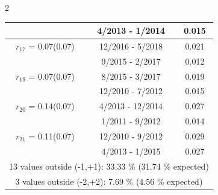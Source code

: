 \begin{multicols}{2}
{\begin{tabular}{ccc}
&        4/2013 -  1/2014 &        0.015  \vspace{-.02in} \\ \hline 
  $r_{17}$ = 0.07(0.07) &      12/2016 -  5/2018 &        0.021   \vspace{-.10in} \\  
&        9/2015 -  2/2017 &        0.012  \vspace{-.02in} \\ \hline 
  $r_{19}$ = 0.07(0.07) &       8/2015 -  3/2017 &        0.019   \vspace{-.10in} \\  
&       12/2010 -  7/2012 &        0.015  \vspace{-.02in} \\ \hline 
  $r_{20}$ = 0.14(0.07) &       4/2013 - 12/2014 &        0.027   \vspace{-.10in} \\  
&        1/2011 -  9/2012 &        0.014  \vspace{-.02in} \\ \hline 
  $r_{21}$ = 0.11(0.07) &      12/2010 -  9/2012 &        0.029   \vspace{-.10in} \\  
&        4/2013 -  1/2015 &        0.027  \vspace{-.02in} \\ \hline 
\multicolumn{3}{c}{              13 values outside (-1,+1): 33.33  \% (31.74  \% expected)}\vspace{-.10in} \\ 
\multicolumn{3}{c}{               3 values outside (-2,+2):  7.69 \%  (4.56 \% expected) } \\
 \end{tabular} \\ 
 } 
\end{multicols} 
